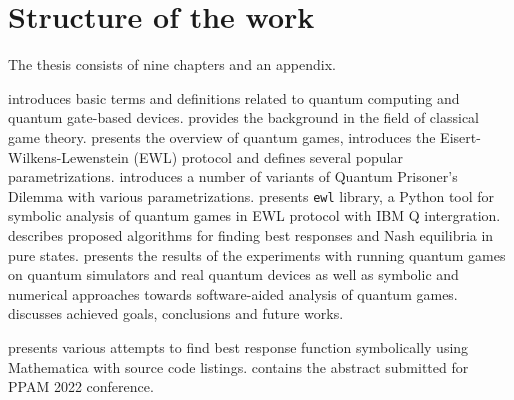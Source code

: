 \documentclass[../main.tex]{subfiles}
\begin{document}



\section{Structure of the work}

The thesis consists of nine chapters and an appendix.

 introduces basic terms and definitions related to quantum computing and quantum gate-based devices.
 provides the background in the field of classical game theory.
 presents the overview of quantum games, introduces the Eisert-Wilkens-Lewenstein (EWL) protocol and defines several popular parametrizations.
 introduces a number of variants of Quantum Prisoner's Dilemma with various parametrizations.
 presents \texttt{ewl} library, a Python tool for symbolic analysis of quantum games in EWL protocol with IBM Q intergration.
 describes proposed algorithms for finding best responses and Nash equilibria in pure states.
 presents the results of the experiments with running quantum games on quantum simulators and real quantum devices as well as symbolic and numerical approaches towards software-aided analysis of quantum games.
 discusses achieved goals, conclusions and future works. 

 presents various attempts to find best response function symbolically using Mathematica with source code listings.
 contains the abstract submitted for PPAM 2022 conference.
\end{document}
